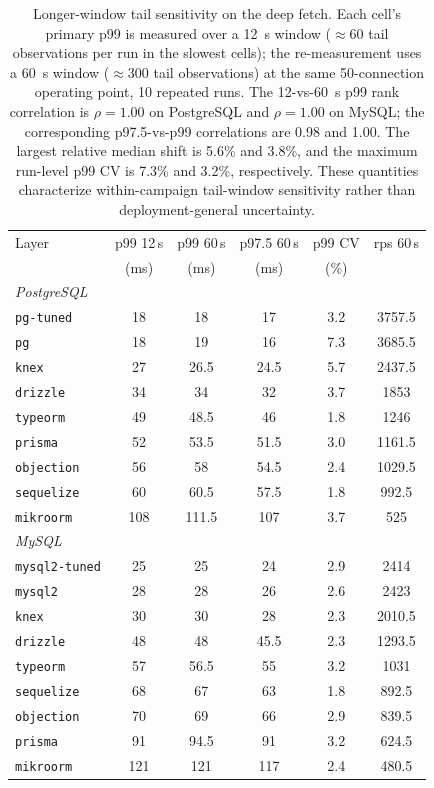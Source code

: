 \begin{table}[htbp]
  \centering
  \small
  \caption{Longer-window tail sensitivity on the deep fetch. Each cell's primary p99 is
    measured over a 12~s window ($\approx$60 tail observations per run in the slowest
    cells); the re-measurement uses a 60~s window ($\approx$300 tail observations) at the
    same 50-connection operating point, 10 repeated runs. The 12-vs-60~s p99 rank correlation is $\rho=1.00$
    on PostgreSQL and $\rho=1.00$ on MySQL; the corresponding
    p97.5-vs-p99 correlations are 0.98 and
    1.00. The largest relative median shift is
    5.6\% and 3.8\%,
    and the maximum run-level p99 CV is 7.3\% and
    3.2\%, respectively. These quantities characterize
    within-campaign tail-window sensitivity rather than deployment-general uncertainty.}
  \label{tab:taillong}
  \begin{tabular}{l ccccc}
    \toprule
    Layer & p99 12\,s & p99 60\,s & p97.5 60\,s & p99 CV & rps 60\,s \\
     & (ms) & (ms) & (ms) & (\%) & \\
    \midrule
    \multicolumn{6}{l}{\emph{PostgreSQL}} \\
    \quad\texttt{pg-tuned} & 18 & 18 & 17 & 3.2 & 3757.5 \\
    \quad\texttt{pg} & 18 & 19 & 16 & 7.3 & 3685.5 \\
    \quad\texttt{knex} & 27 & 26.5 & 24.5 & 5.7 & 2437.5 \\
    \quad\texttt{drizzle} & 34 & 34 & 32 & 3.7 & 1853 \\
    \quad\texttt{typeorm} & 49 & 48.5 & 46 & 1.8 & 1246 \\
    \quad\texttt{prisma} & 52 & 53.5 & 51.5 & 3.0 & 1161.5 \\
    \quad\texttt{objection} & 56 & 58 & 54.5 & 2.4 & 1029.5 \\
    \quad\texttt{sequelize} & 60 & 60.5 & 57.5 & 1.8 & 992.5 \\
    \quad\texttt{mikroorm} & 108 & 111.5 & 107 & 3.7 & 525 \\
    \multicolumn{6}{l}{\emph{MySQL}} \\
    \quad\texttt{mysql2-tuned} & 25 & 25 & 24 & 2.9 & 2414 \\
    \quad\texttt{mysql2} & 28 & 28 & 26 & 2.6 & 2423 \\
    \quad\texttt{knex} & 30 & 30 & 28 & 2.3 & 2010.5 \\
    \quad\texttt{drizzle} & 48 & 48 & 45.5 & 2.3 & 1293.5 \\
    \quad\texttt{typeorm} & 57 & 56.5 & 55 & 3.2 & 1031 \\
    \quad\texttt{sequelize} & 68 & 67 & 63 & 1.8 & 892.5 \\
    \quad\texttt{objection} & 70 & 69 & 66 & 2.9 & 839.5 \\
    \quad\texttt{prisma} & 91 & 94.5 & 91 & 3.2 & 624.5 \\
    \quad\texttt{mikroorm} & 121 & 121 & 117 & 2.4 & 480.5 \\
    \bottomrule
  \end{tabular}
\end{table}
